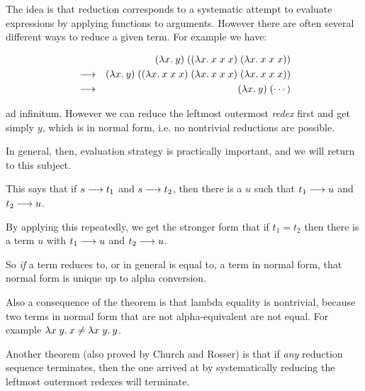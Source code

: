 \begin{slide*}


\vspace*{0.5cm}

The idea is that reduction corresponds to a systematic attempt to evaluate
expressions by applying functions to arguments. However there are often several
different ways to reduce a given term. For example we have:

\begin{red}
\begin{eqnarray*}
& & (\lambda x.\: y)\; ((\lambda x.\: x\; x\; x)\;(\lambda x.\: x\; x\; x))     \\
& \longrightarrow & (\lambda x.\: y)\; ((\lambda x.\: x\; x\; x)\;(\lambda x.\: x\; x\; x)\;
                            (\lambda x.\: x\; x\; x))                           \\
& \longrightarrow & (\lambda x.\: y)\; (\cdots)
\end{eqnarray*}
\end{red}

ad infinitum. However we can reduce the leftmost outermost {\em redex} first
and get simply {\red $y$}, which is in normal form, i.e. no nontrivial
reductions are possible.

In general, then, evaluation strategy is practically important, and we will
return to this subject.

\end{slide*}


\begin{slide*}


\vspace*{0.5cm}

This says that if {\red $s \longrightarrow t_1$} and {\red $s \longrightarrow t_2$}, then there
is a {\red $u$} such that {\red $t_1 \longrightarrow u$} and {\red $t_2 \longrightarrow u$}.

By applying this repeatedly, we get the stronger form that if {\red $t_1 =
t_2$} then there is a term {\red $u$} with {\red $t_1 \longrightarrow u$} and {\red
$t_2 \longrightarrow u$}.

So {\em if} a term reduces to, or in general is equal to, a term in normal
form, that normal form is unique up to alpha conversion.

Also a consequence of the theorem is that lambda equality is nontrivial,
because two terms in normal form that are not alpha-equivalent are not equal.
For example {\red $\lambda x\; y.\: x \not= \lambda x\; y.\: y$}.

Another theorem (also proved by Church and Rosser) is that if {\em any}
reduction sequence terminates, then the one arrived at by systematically
reducing the leftmost outermost redexes will terminate.

\end{slide*}


